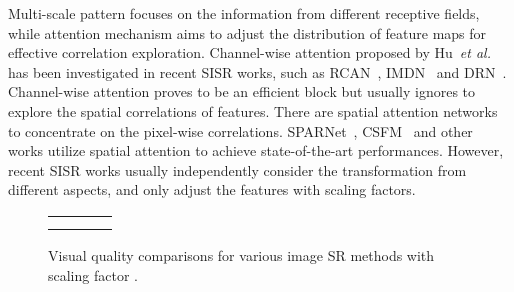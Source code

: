 \documentclass[manuscript,screen]{acmart}
\begin{document}
Multi-scale pattern focuses on the information from different receptive fields, while attention mechanism aims to adjust the distribution of feature maps for effective correlation exploration. Channel-wise attention proposed by Hu~\textit{et al.}~\cite{senet_pami2020} has been investigated in recent SISR works, such as RCAN~\cite{rcan_eccv2018}, IMDN~\cite{imdn_mm2019} and DRN~\cite{drn_cvpr2020}. Channel-wise attention proves to be an efficient block but usually ignores to explore the spatial correlations of features. There are spatial attention networks to concentrate on the pixel-wise correlations. SPARNet~\cite{sparnet_tip2020}, CSFM~\cite{csfm_csvt2020} and other works utilize spatial attention to achieve state-of-the-art performances. However, recent SISR works usually independently consider the transformation from different aspects, and only adjust the features with scaling factors.

\begin{figure}[t]
	\captionsetup[subfloat]{labelformat=empty, justification=centering}
	\begin{center}
		\newcommand{\rowArg}{2.2cm}
		\newcommand{\fullSize}{4.9cm}
		\newcommand{\fullWidth}{7cm}
		\newcommand{\patchSize}{2cm}
		\scriptsize
		\setlength\tabcolsep{0.05cm}
		\begin{tabular}[b]{c c c c c c}
			\multicolumn{3}{c}{\multirow{2}{*}[\rowArg]{
					\subfloat[image\_024 from Urban100~\cite{urban100}]
					{\includegraphics[height=\fullSize, width=\fullWidth]
						{Figs/img_024/full_HR.png}}}} &
			\subfloat[HR~\protect\linebreak(PSNR/SSIM)]
			{\includegraphics[width = \patchSize, height = \patchSize]
				{Figs/img_024/part_HR.png}} &
			\subfloat[Bicubic~\protect\linebreak(16.94/0.5539)]
			{\includegraphics[width = \patchSize, height = \patchSize]
				{Figs/img_024/part_bicubic.png}} &
			\subfloat[MSLapSRN~\cite{lapsrn_pami2019} \protect\linebreak(18.10/0.6714)]
			{\includegraphics[width = \patchSize, height = \patchSize]
				{Figs/img_024/part_LapSRN.png}} \\ [-0.3cm]
			& & & 
			\subfloat[CARN~\cite{carn_eccv2018} \protect\linebreak(18.84/0.7132)]
			{\includegraphics[width = \patchSize, height = \patchSize]
				{Figs/img_024/part_CARN.png}} &
			\subfloat[MSRN~\cite{msrn_eccv2018} \protect\linebreak(18.81/0.7224)]
			{\includegraphics[width = \patchSize, height = \patchSize]
				{Figs/img_024/part_MSRN.png}} &
			\subfloat[SHSR\protect\linebreak(\textbf{19.09}/\textbf{0.7340})]
			{\includegraphics[width = \patchSize, height = \patchSize]
				{Figs/img_024/part_PMRN.png}} \\
		\end{tabular}
	\end{center}
	\setlength{\abovecaptionskip}{0pt plus 2pt minus 2pt}
	\setlength{\belowcaptionskip}{0pt plus 2pt minus 2pt}
	\caption{Visual quality comparisons for various image SR methods with scaling factor .}
	\label{fig:slogan}
\end{figure}
\end{document}
